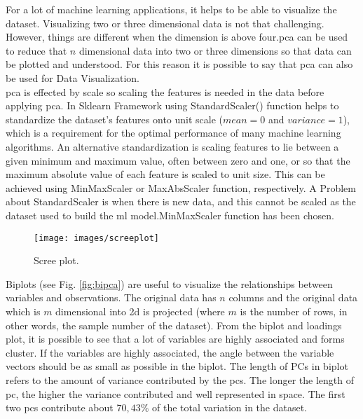 \noindent For a lot of machine learning applications, it helps to be able to visualize the dataset. Visualizing two or three dimensional data is not that challenging. However, things are different when the dimension is above four.\gls{pca} can be used to reduce that $n$ dimensional data into two or three dimensions so that data can be plotted and understood. For this reason it is possible to say that \gls{pca} can also be used for Data Visualization. \\

\noindent \gls{pca} is effected by scale so scaling the features is needed in the data before applying \gls{pca}. In Sklearn Framework using StandardScaler() function helps to standardize the dataset’s features onto unit scale ($mean = 0$ and $variance = 1$), which is a requirement for the optimal performance of many machine learning algorithms. An alternative standardization is scaling features to lie between a given minimum and maximum value, often between zero and one, or so that the maximum absolute value of each feature is scaled to unit size. This can be achieved using MinMaxScaler or MaxAbsScaler function, respectively. A Problem about StandardScaler is when there is new data, and this cannot be scaled as the dataset used to build the \gls{ml} model.MinMaxScaler function has been chosen. \\

\begin{figure}
	\centering
	\texttt{[image: images/screeplot]}
	\caption[Scree plot.]{Scree plot.}
	\label{fig:screeplot}
\end{figure}

\noindent Biplots (see Fig. \ref{fig:bipca}) are useful to visualize the relationships between variables and observations. The original data has $n$ columns and the original data which is $m$ dimensional into \gls{2d} is projected (where $m$ is the number of rows, in other words, the sample number of the dataset). From the biplot and loadings plot, it is possible to see that a lot of variables are highly associated and forms cluster. If the variables are highly associated, the angle between the variable vectors should be as small as possible in the biplot. The length of PCs in biplot refers to the amount of variance contributed by the \glspl{pc}. The longer the length of \gls{pc}, the higher the variance contributed and well represented in space. The first two \glspl{pc} contribute about $70,43\%$ of the total variation in the dataset. \\

